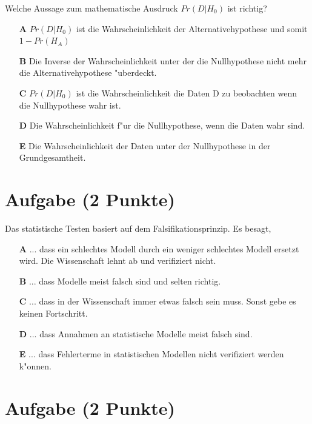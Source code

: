 \documentclass[a4paper, 9pt]{scrartcl}\usepackage[]{graphicx}\usepackage[]{xcolor}
\begin{document}
Welche Aussage zum mathematische Ausdruck $Pr(D|H_0)$ ist richtig? 



\begin{enumerate}
\item [\textbf{A} \msquare] $Pr(D|H_0)$ ist die Wahrscheinlichkeit der Alternativehypothese und somit $1 - Pr(H_A)$
\item [\textbf{B} \msquare] Die Inverse der Wahrscheinlichkeit unter der die Nullhypothese nicht mehr die Alternativehypothese {"u}berdeckt.
\item [\textbf{C} \msquare] $Pr(D|H_0)$ ist die Wahrscheinlichkeit die Daten D zu beobachten wenn die Nullhypothese wahr ist.
\item [\textbf{D} \msquare] Die Wahrscheinlichkeit f{"u}r die Nullhypothese, wenn die Daten wahr sind.
\item [\textbf{E} \msquare] Die Wahrscheinlichkeit der Daten unter der Nullhypothese in der Grundgesamtheit.
\end{enumerate}

\section{Aufgabe \hfill (2 Punkte)}



Das statistische Testen basiert auf dem Falsifikationsprinzip. Es besagt,



\begin{enumerate}
\item [\textbf{A} \msquare] ... dass ein schlechtes Modell durch ein weniger schlechtes Modell ersetzt wird. Die Wissenschaft lehnt ab und verifiziert nicht.
\item [\textbf{B} \msquare] ... dass Modelle meist falsch sind und selten richtig.
\item [\textbf{C} \msquare] ... dass in der Wissenschaft immer etwas falsch sein muss. Sonst gebe es keinen Fortschritt.
\item [\textbf{D} \msquare] ... dass Annahmen an statistische Modelle meist falsch sind.
\item [\textbf{E} \msquare] ... dass Fehlerterme in statistischen Modellen nicht verifiziert werden k{"o}nnen.
\end{enumerate}

\section{Aufgabe \hfill (2 Punkte)}
\end{document}
